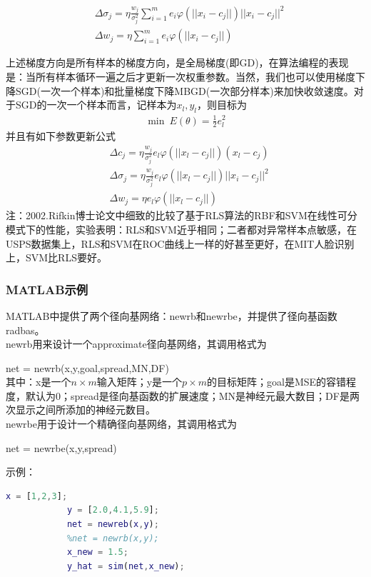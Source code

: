 {\begin{align*}
            & \Delta \sigma_j = \eta \frac{w_j}{\sigma_j^2} \sum_{i=1}^m e_i \varphi (||x_i-c_j||)||x_i-c_j||^2\\
            & \Delta w_j = \eta \sum_{i=1}^m e_i\varphi (||x_i-c_j||)
            \end{align*}
            \par
            上述梯度方向是所有样本的梯度方向，是全局梯度(即GD)，在算法编程的表现是：当所有样本循环一遍之后才更新一次权重参数。当然，我们也可以使用梯度下降SGD(一次一个样本)和批量梯度下降MBGD(一次部分样本)来加快收敛速度。对于SGD的一次一个样本而言，记样本为$x_l,y_l$，则目标为
            \begin{align*}
            \min \ E(\theta)  = \frac{1}{2} e_l^2
            \end{align*}
            并且有如下参数更新公式
            \begin{align*}
            & \Delta c_j = \eta \frac{w_j}{\sigma_j^2} e_l \varphi (||x_l-c_j||)(x_l-c_j)\\
            & \Delta \sigma_j = \eta \frac{w_j}{\sigma_j^2} e_l \varphi (||x_l-c_j||)||x_i-c_j||^2\\
            & \Delta w_j = \eta  e_l\varphi (||x_l-c_j||)
            \end{align*}
            注：2002.Rifkin博士论文中细致的比较了基于RLS算法的RBF和SVM在线性可分模式下的性能，实验表明：RLS和SVM近乎相同；二者都对异常样本点敏感，在USPS数据集上，RLS和SVM在ROC曲线上一样的好甚至更好，在MIT人脸识别上，SVM比RLS要好。
        \subsubsection{MATLAB示例}
            \par
            MATLAB中提供了两个径向基网络：newrb和newrbe，并提供了径向基函数radbas。\\
            newrb用来设计一个approximate径向基网络，其调用格式为
            \par
            net = newrb(x,y,goal,spread,MN,DF)\\
            其中：x是一个$n\times m$输入矩阵；y是一个$p\times m$的目标矩阵；goal是MSE的容错程度，默认为0；spread是径向基函数的扩展速度；MN是神经元最大数目；DF是两次显示之间所添加的神经元数目。\\
            newrbe用于设计一个精确径向基网络，其调用格式为
            \par
            net = newrbe(x,y,spread)
            \par
            示例：
            \begin{lstlisting}[language = Matlab]
            x = [1,2,3];
            y = [2.0,4.1,5.9];
            net = newreb(x,y);
            %net = newrb(x,y);
            x_new = 1.5;
            y_hat = sim(net,x_new);
            \end{lstlisting}
}
